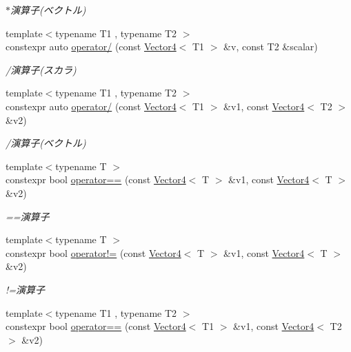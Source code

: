 \begin{DoxyCompactItemize}
\begin{DoxyCompactList}\small\item\em $\ast$演算子(ベクトル) \end{DoxyCompactList}\item 
{\footnotesize template$<$typename T1 , typename T2 $>$ }\\constexpr auto \mbox{\hyperlink{namespacesaki_a5170a233051df50d389f8f3453fc0fc2}{operator/}} (const \mbox{\hyperlink{classsaki_1_1_vector4}{Vector4}}$<$ T1 $>$ \&v, const T2 \&scalar)
\begin{DoxyCompactList}\small\item\em /演算子(スカラ) \end{DoxyCompactList}\item 
{\footnotesize template$<$typename T1 , typename T2 $>$ }\\constexpr auto \mbox{\hyperlink{namespacesaki_a32509cf81fad65763330008503395613}{operator/}} (const \mbox{\hyperlink{classsaki_1_1_vector4}{Vector4}}$<$ T1 $>$ \&v1, const \mbox{\hyperlink{classsaki_1_1_vector4}{Vector4}}$<$ T2 $>$ \&v2)
\begin{DoxyCompactList}\small\item\em /演算子(ベクトル) \end{DoxyCompactList}\item 
{\footnotesize template$<$typename T $>$ }\\constexpr bool \mbox{\hyperlink{namespacesaki_ab4626967b917017c2acf6ad76789db6c}{operator==}} (const \mbox{\hyperlink{classsaki_1_1_vector4}{Vector4}}$<$ T $>$ \&v1, const \mbox{\hyperlink{classsaki_1_1_vector4}{Vector4}}$<$ T $>$ \&v2)
\begin{DoxyCompactList}\small\item\em ==演算子 \end{DoxyCompactList}\item 
{\footnotesize template$<$typename T $>$ }\\constexpr bool \mbox{\hyperlink{namespacesaki_a0d4a71a1a84ddfe22acf3ffd305f1449}{operator!=}} (const \mbox{\hyperlink{classsaki_1_1_vector4}{Vector4}}$<$ T $>$ \&v1, const \mbox{\hyperlink{classsaki_1_1_vector4}{Vector4}}$<$ T $>$ \&v2)
\begin{DoxyCompactList}\small\item\em !=演算子 \end{DoxyCompactList}\item 
{\footnotesize template$<$typename T1 , typename T2 $>$ }\\constexpr bool \mbox{\hyperlink{namespacesaki_a3c0f3a38ce313956032cd123f702b7a5}{operator==}} (const \mbox{\hyperlink{classsaki_1_1_vector4}{Vector4}}$<$ T1 $>$ \&v1, const \mbox{\hyperlink{classsaki_1_1_vector4}{Vector4}}$<$ T2 $>$ \&v2)

\end{DoxyCompactItemize}
